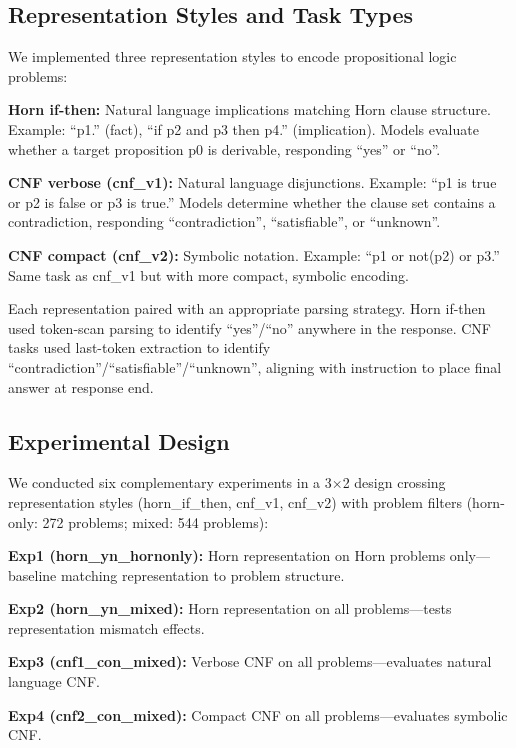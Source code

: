 \documentclass[pdflatex,sn-mathphys-num]{sn-jnl}%
\theoremstyle{thmstyleone}%
\theoremstyle{thmstyletwo}%
\theoremstyle{thmstylethree}%
\begin{document}
\subsection{Representation Styles and Task Types}\label{subsec:representations}

We implemented three representation styles to encode propositional logic problems:

\textbf{Horn if-then:} Natural language implications matching Horn clause structure. Example: ``p1.'' (fact), ``if p2 and p3 then p4.'' (implication). Models evaluate whether a target proposition p0 is derivable, responding ``yes'' or ``no''.

\textbf{CNF verbose (cnf\_v1):} Natural language disjunctions. Example: ``p1 is true or p2 is false or p3 is true.'' Models determine whether the clause set contains a contradiction, responding ``contradiction'', ``satisfiable'', or ``unknown''.

\textbf{CNF compact (cnf\_v2):} Symbolic notation. Example: ``p1 or not(p2) or p3.'' Same task as cnf\_v1 but with more compact, symbolic encoding.

Each representation paired with an appropriate parsing strategy. Horn if-then used token-scan parsing to identify ``yes''/``no'' anywhere in the response. CNF tasks used last-token extraction to identify ``contradiction''/``satisfiable''/``unknown'', aligning with instruction to place final answer at response end.

\subsection{Experimental Design}\label{subsec:experiments}

We conducted six complementary experiments in a 3×2 design crossing representation styles (horn\_if\_then, cnf\_v1, cnf\_v2) with problem filters (horn-only: 272 problems; mixed: 544 problems):

\textbf{Exp1 (horn\_yn\_hornonly):} Horn representation on Horn problems only—baseline matching representation to problem structure.

\textbf{Exp2 (horn\_yn\_mixed):} Horn representation on all problems—tests representation mismatch effects.

\textbf{Exp3 (cnf1\_con\_mixed):} Verbose CNF on all problems—evaluates natural language CNF.

\textbf{Exp4 (cnf2\_con\_mixed):} Compact CNF on all problems—evaluates symbolic CNF.
\end{document}
